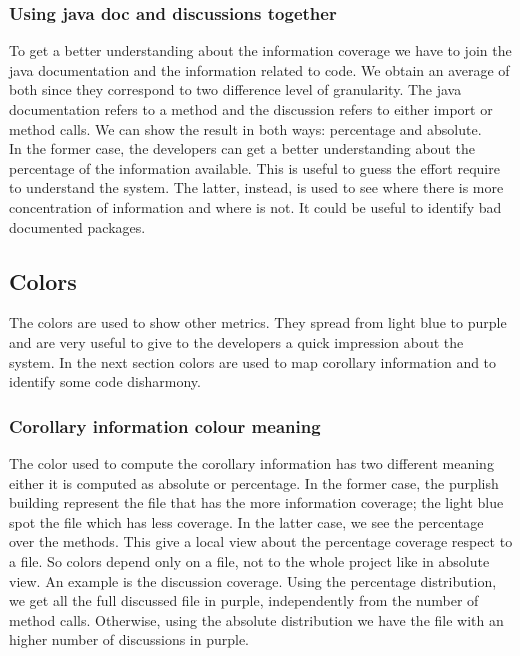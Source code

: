 \documentclass[]{usiinfbachelorproject}
\begin{document}
\subsubsection{Using java doc and discussions together}

To get a better understanding about the information coverage we have to join the java documentation and the information related to code. We obtain an average of both since they correspond to two difference level of granularity. The java documentation refers to a method and the discussion refers to either import or method calls. We can show the result in both ways: percentage and absolute.\\
In the former case, the developers can get a better understanding about the percentage of the information available. This is useful to guess the effort require to understand the system. The latter, instead, is used to see where there is more concentration of information and where is not. It could be useful to identify  bad documented packages.

  

\newpage

\subsection{Colors}
The colors are used to show other metrics. They spread from light blue to purple and are very useful to give to the developers a quick impression about the system. In the next section colors are used to map corollary information and to identify some code disharmony.


\subsubsection{Corollary information colour meaning}
The color used to compute the corollary information has two different meaning either it is computed as absolute or percentage. In the former case, the purplish building represent the file that has the more information coverage; the light blue spot the file which has less coverage. In the latter case, we see the percentage over the methods. This give a local view about the percentage coverage respect to a file. So colors depend only on a file, not to the whole project like in absolute view.
An example is the discussion coverage. Using the percentage distribution, we get all the full discussed file in purple, independently from the number of method calls. Otherwise, using the absolute distribution we have the file with an higher number of discussions in purple.
\end{document}
